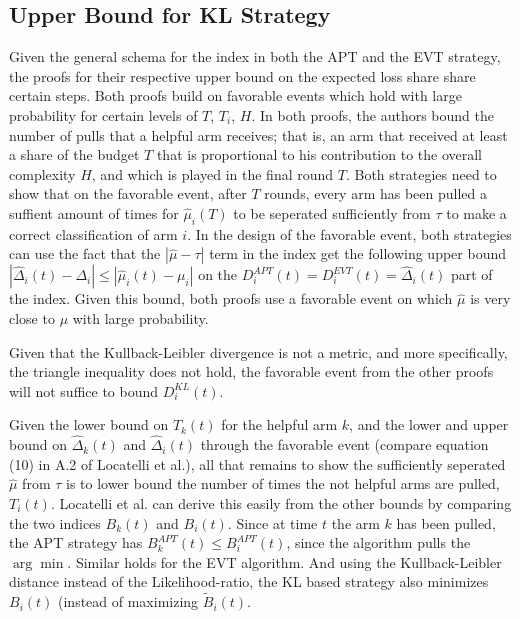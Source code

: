 \documentclass[12pt,]{article}
\begin{document}
\subsection{Upper Bound for KL
Strategy}\label{upper-bound-for-kl-strategy}

Given the general schema for the index in both the APT and the EVT
strategy, the proofs for their respective upper bound on the expected
loss share share certain steps. Both proofs build on favorable events
which hold with large probability for certain levels of \(T\), \(T_i\),
\(H\). In both proofs, the authors bound the number of pulls that a
helpful arm receives; that is, an arm that received at least a share of
the budget \(T\) that is proportional to his contribution to the overall
complexity \(H\), and which is played in the final round \(T\). Both
strategies need to show that on the favorable event, after \(T\) rounds,
every arm has been pulled a suffient amount of times for
\(\hat{\mu}_i(T)\) to be seperated sufficiently from \(\tau\) to make a
correct classification of arm \(i\). In the design of the favorable
event, both strategies can use the fact that the \(|\hat{\mu} - \tau|\)
term in the index get the following upper bound
\(|\hat{\Delta}_i(t) - \Delta_i| \leq |\hat{\mu}_i(t)-\mu_i|\) on the
\(D_i^{APT}(t) = D_i^{EVT}(t) = \hat{\Delta}_i(t)\) part of the index.
Given this bound, both proofs use a favorable event on which
\(\hat{\mu}\) is very close to \(\mu\) with large probability.

Given that the Kullback-Leibler divergence is not a metric, and more
specifically, the triangle inequality does not hold, the favorable event
from the other proofs will not suffice to bound \(D_i^{KL}(t)\).

Given the lower bound on \(T_k(t)\) for the helpful arm \(k\), and the
lower and upper bound on \(\hat{\Delta}_k(t)\) and \(\hat{\Delta}_i(t)\)
through the favorable event (compare equation (10) in A.2 of Locatelli
et al.), all that remains to show the sufficiently seperated
\(\hat{\mu}\) from \(\tau\) is to lower bound the number of times the
not helpful arms are pulled, \(T_i(t)\). Locatelli et al. can derive
this easily from the other bounds by comparing the two indices
\(B_k(t)\) and \(B_i(t)\). Since at time \(t\) the arm \(k\) has been
pulled, the APT strategy has \(B_k^{APT}(t) \leq B_i^{APT}(t)\), since
the algorithm pulls the \(\arg \min\). Similar holds for the EVT
algorithm. And using the Kullback-Leibler distance instead of the
Likelihood-ratio, the KL based strategy also minimizes \(B_i(t)\)
(instead of maximizing \(\tilde{B}_i(t)\).
\end{document}
